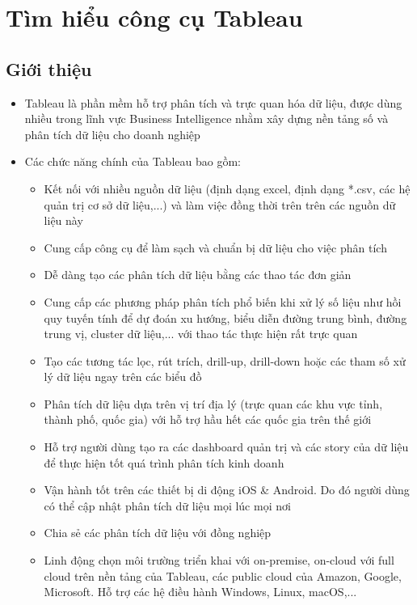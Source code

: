 \documentclass[a4paper, 12pt]{article}
\begin{document}
\clearpage

\section{Tìm hiểu công cụ Tableau}

\subsection{Giới thiệu}

\begin{itemize}
    \item Tableau là phần mềm hỗ trợ phân tích và trực quan hóa dữ liệu, được dùng nhiều trong lĩnh vực Business Intelligence nhằm xây dựng nền tảng số và phân tích dữ liệu cho doanh nghiệp
    \item Các chức năng chính của Tableau bao gồm:
    \begin{itemize}
        \item Kết nối với nhiều nguồn dữ liệu (định dạng excel, định dạng *.csv, các hệ quản trị cơ sở dữ liệu,...) và làm việc đồng thời trên trên các nguồn dữ liệu này
        \item Cung cấp công cụ để làm sạch và chuẩn bị dữ liệu cho việc phân tích
        \item Dễ dàng tạo các phân tích dữ liệu bằng các thao tác đơn giản
        \item Cung cấp các phương pháp phân tích phổ biến khi xử lý số liệu như hồi quy tuyến tính để dự đoán xu hướng, biểu diễn đường trung bình, đường trung vị, cluster dữ liệu,... với thao tác thực hiện rất trực quan
        \item Tạo các tương tác lọc, rút trích, drill-up, drill-down hoặc các tham số xử lý dữ liệu ngay trên các biểu đồ
        \item Phân tích dữ liệu dựa trên vị trí địa lý (trực quan các khu vực tỉnh, thành phố, quốc gia) với hỗ trợ hầu hết các quốc gia trên thế giới
        \item Hỗ trợ người dùng tạo ra các dashboard quản trị và các story của dữ liệu để thực hiện tốt quá trình phân tích kinh doanh
        \item Vận hành tốt trên các thiết bị di động iOS \& Android. Do đó người dùng có thể cập nhật phân tích dữ liệu mọi lúc mọi nơi
        \item Chia sẻ các phân tích dữ liệu với đồng nghiệp
        \item Linh động chọn môi trường triển khai với on-premise, on-cloud với full cloud trên nền tảng của Tableau, các public cloud của Amazon, Google, Microsoft. Hỗ trợ các hệ điều hành Windows, Linux, macOS,...
    \end{itemize}


\end{itemize}
\end{document}
